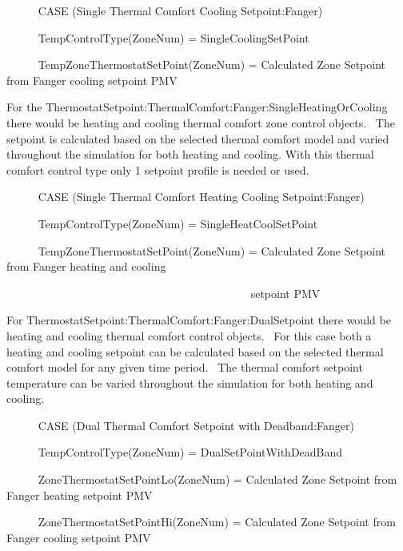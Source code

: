~~~~~ CASE (Single Thermal Comfort Cooling Setpoint:Fanger)

~~~~~ TempControlType(ZoneNum) = SingleCoolingSetPoint

~~~~~ TempZoneThermostatSetPoint(ZoneNum) = Calculated Zone Setpoint from Fanger cooling setpoint PMV

For the ThermostatSetpoint:ThermalComfort:Fanger:SingleHeatingOrCooling there would be heating and cooling thermal comfort zone control objects.~ The setpoint is calculated based on the selected thermal comfort model and varied throughout the simulation for both heating and cooling. With this thermal comfort control type only 1 setpoint profile is needed or used.

~~~~~ CASE (Single Thermal Comfort Heating Cooling Setpoint:Fanger)

~~~~~ TempControlType(ZoneNum) = SingleHeatCoolSetPoint

~~~~~ TempZoneThermostatSetPoint(ZoneNum) = Calculated Zone Setpoint from Fanger heating and cooling

~~~~~~~~~~~~~~~~~~~~~~~~~~~~~~~~~~~~~~~~~~~ setpoint PMV

For ThermostatSetpoint:ThermalComfort:Fanger:DualSetpoint there would be heating and cooling thermal comfort control objects.~ For this case both a heating and cooling setpoint can be calculated based on the selected thermal comfort model for any given time period.~ The thermal comfort setpoint temperature can be varied throughout the simulation for both heating and cooling.

~~~~~ CASE (Dual Thermal Comfort Setpoint with Deadband:Fanger)

~~~~~ TempControlType(ZoneNum) = DualSetPointWithDeadBand

~~~~~ ZoneThermostatSetPointLo(ZoneNum) = Calculated Zone Setpoint from Fanger heating setpoint PMV

~~~~~ ZoneThermostatSetPointHi(ZoneNum) = Calculated Zone Setpoint from Fanger cooling setpoint PMV
